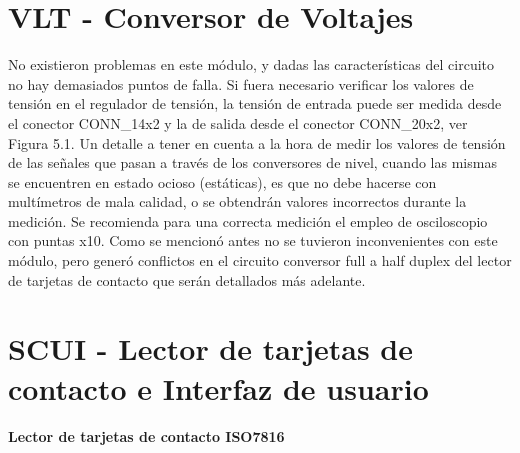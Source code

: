 \section{VLT - Conversor de Voltajes}
No existieron problemas en este módulo, y dadas las características del circuito
no hay demasiados puntos de falla. Si fuera necesario verificar los valores de
tensión en el regulador de tensión, la tensión de entrada puede ser medida desde
el conector CONN\_14x2 y la de salida desde el conector CONN\_20x2, ver Figura 5.1.
Un detalle a tener en cuenta a la hora de medir los valores de tensión de las
señales que pasan a través de los conversores de nivel, cuando las mismas se 
encuentren en estado ocioso (estáticas), es que no debe hacerse con multímetros 
de mala calidad, o se obtendrán valores incorrectos durante la medición. Se 
recomienda para una correcta medición el empleo de osciloscopio con puntas x10. 
Como se mencionó antes no se tuvieron inconvenientes con este módulo, pero generó 
conflictos en el circuito conversor full a half duplex del lector de tarjetas de 
contacto que serán detallados más adelante.


\section{SCUI - Lector de tarjetas de contacto e Interfaz de usuario}

{\bf{Lector de tarjetas de contacto ISO7816}}

